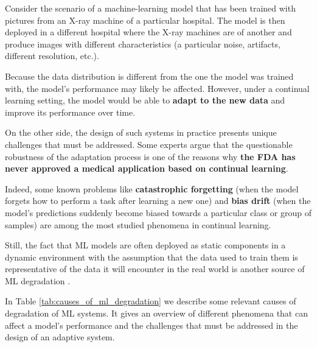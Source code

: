 \documentclass[../main.tex]{subfiles}
\begin{document}
    Consider the scenario of a machine-learning model that has been trained with pictures from an X-ray machine of a particular hospital. The model is then deployed in a different hospital where the X-ray machines are of another and produce images with different characteristics (a particular noise, artifacts, different resolution, etc.). 
    
    Because the data distribution is different from the one the model was trained with, the model's performance may likely be affected. However, under a continual learning setting, the model would be able to \textbf{adapt to the new data} and improve its performance over time. 

    
    On the other side, the design of such systems in practice presents unique challenges that must be addressed. Some experts argue that the questionable robustness of the adaptation process \cite{vokingerContinualLearningMedical2021} is one of the reasons why \textbf{the FDA has never approved a medical application based on continual learning}.
    
    Indeed, some known problems like \textbf{catastrophic forgetting} (when the model forgets how to perform a task after learning a new one) and \textbf{bias drift} (when the model's predictions suddenly become biased towards a particular class or group of samples) are among the most studied phenomena in continual learning.
    
    
    Still, the fact that ML models are often deployed as static components in a dynamic environment with the assumption that the data used to train them is representative of the data it will encounter in the real world is another source of ML degradation \cite{vokingerContinualLearningMedical2021}.

    In Table \ref{tab:causes_of_ml_degradation} we describe some relevant causes of degradation of ML systems. It gives an overview of different phenomena that can affect a model's performance and the challenges that must be addressed in the design of an adaptive system.
    
\end{document}
